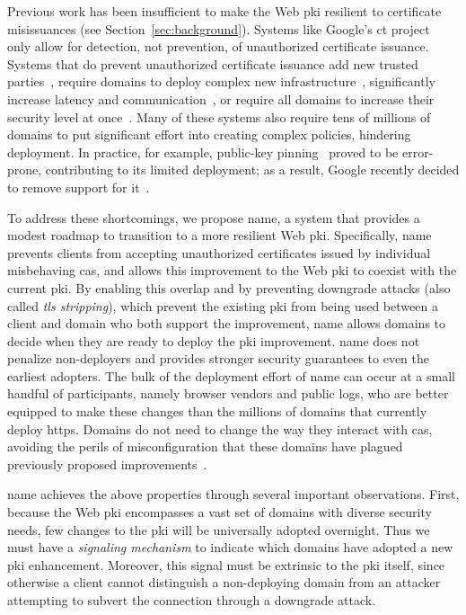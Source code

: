 Previous work has been insufficient to make the Web \ac{pki} resilient to
certificate misissuances (see Section~\ref{sec:background}). Systems like
Google's \ac{ct} project~\cite{rfc6962} only allow for detection, not
prevention, of unauthorized certificate issuance. Systems that do prevent
unauthorized certificate issuance add new trusted
parties~\cite{kim2013accountable}, require domains to deploy complex new
infrastructure~\cite{rfc6698, szalachowski2014policert}, significantly increase
latency and communication~\cite{yu2016dtki}, or require all domains to increase
their security level at once~\cite{basin2014arpki}. Many of these systems also
require tens of millions of domains to put significant effort into creating
complex policies, hindering deployment.  In practice, for example, public-key
pinning~\cite{rfc7469} proved to be error-prone, contributing to its limited
deployment; as a result, Google recently decided to remove support for
it~\cite{palmer2017intent}.

To address these shortcomings, we propose \ac{name}, a system that provides a
modest roadmap to transition to a more resilient Web \ac{pki}. Specifically,
\ac{name} prevents clients from accepting unauthorized certificates issued by
individual misbehaving \acp{ca}, and allows this improvement to the Web \ac{pki}
to coexist with the current \ac{pki}. By enabling this overlap and by preventing
downgrade attacks (also called \emph{\ac{tls} stripping}), which prevent the
existing \ac{pki} from being used between a client and domain who both support
the improvement, \ac{name} allows domains to decide when they are ready to
deploy the \ac{pki} improvement.  \ac{name} does not penalize non-deployers and
provides stronger security guarantees to even the earliest adopters. The bulk of
the deployment effort of \ac{name} can occur at a small handful of participants,
namely browser vendors and public logs, who are better equipped to make these
changes than the millions of domains that currently deploy \ac{https}. Domains
do not need to change the way they interact with \acp{ca}, avoiding the perils
of misconfiguration that these domains have plagued previously proposed
improvements~\cite{palmer2017intent}.

\ac{name} achieves the above properties through several important observations.
First, because the Web \ac{pki} encompasses a vast set of domains with diverse
security needs, few changes to the \ac{pki} will be universally adopted
overnight. Thus we must have a \emph{signaling mechanism} to indicate which
domains have adopted a new \ac{pki} enhancement. Moreover, this signal must be
extrinsic to the \ac{pki} itself, since otherwise a client cannot distinguish a
non-deploying domain from an attacker attempting to subvert the connection
through a downgrade attack.

